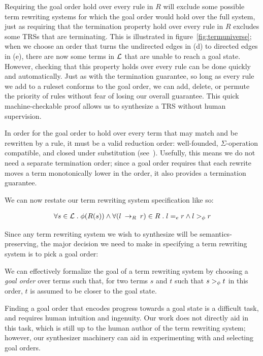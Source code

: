 Requiring the goal order hold over every rule in $R$ will exclude some possible term rewriting systems for which the goal order would hold over the full system, just as requiring that the termination property hold over every rule in $R$ excludes some TRSs that are terminating. This is illustrated in figure~\ref{fig:termuniverse}; when we choose an order that turns the undirected edges in (d) to directed edges in (e), there are now some terms in $\mathcal{L}$ that are unable to reach a goal state. However, checking that this property holds over every rule can be done quickly and automatically. Just as with the termination guarantee, so long as every rule we add to a ruleset conforms to the goal order, we can add, delete, or permute the priority of rules without fear of losing our overall guarantee. This quick machine-checkable proof allows us to synthesize a TRS without human supervision.

In order for the goal order to hold over every term that may match and be rewritten by a rule, it must be a valid reduction order: well-founded, $\Sigma$-operation compatible, and closed under substitution (see~\citep{baader1999term}). Usefully, this means we do not need a separate termination order; since a goal order requires that each rewrite moves a term monotonically lower in the order, it also provides a termination guarantee.

We can now restate our term rewriting system specification like so:

\begin{align*}
    \forall s \in \mathcal{L} \;.\; \phi(R(s)) \wedge \forall (l \:\rightarrow_{R}\: r) \in R \;.\; l =_e r \wedge l >_{\phi} r
\end{align*}

Since any term rewriting system we wish to synthesize will be semantics-preserving, the major decision we need to make in specifying a term rewriting system is to pick a goal order:

\begin{assumption}
We can effectively formalize the goal of a term rewriting system by choosing a \emph{goal order} over terms such that, for two terms $s$ and $t$ such that $s >_{\phi} t$ in this order, $t$ is assumed to be closer to the goal state.
\end{assumption}

Finding a goal order that encodes progress towards a goal state is a difficult task, and requires human intuition and ingenuity. Our work does not directly aid in this task, which is still up to the human author of the term rewriting system; however, our synthesizer machinery can aid in experimenting with and selecting goal orders.

